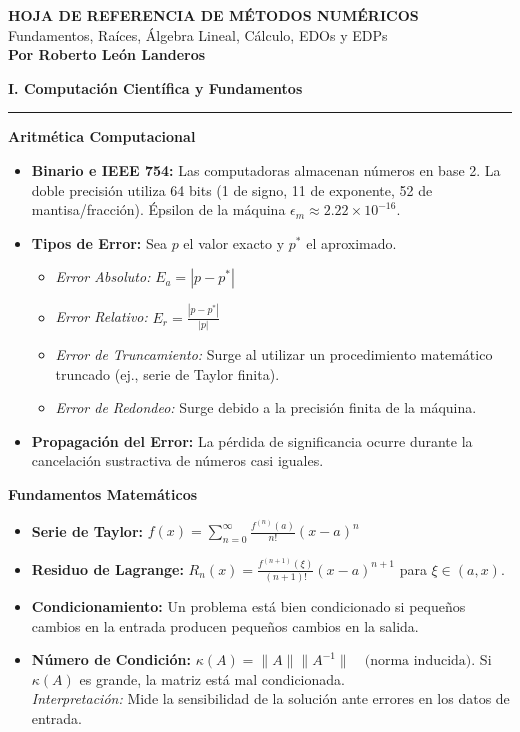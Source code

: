 \documentclass[10pt, landscape, twocolumn]{article}
\newcommand{\cheatsheetsection}[1]{
    \vspace{0.6em}
    {\color{themeblue}\large\bfseries #1} \par
    \vspace{-0.5em}
    {\color{themeblue}\rule{\linewidth}{1pt}} \par
    \vspace{0.2em}
}
\newcommand{\cheatsheetsubsection}[1]{
    \vspace{0.4em}
    {\color{themeblue}\normalsize\bfseries #1} \par
    \vspace{0.1em}
}
\begin{document}
\begin{center}
    \vspace{-1em}
    {\color{themeblue}\huge\bfseries HOJA DE REFERENCIA DE MÉTODOS NUMÉRICOS}\\[0.6em]
    {\color{themegray}\small Fundamentos, Raíces, Álgebra Lineal, Cálculo, EDOs y EDPs}\\[0.4em]
    {\color{themegray}\footnotesize \textbf{Por Roberto León Landeros}}
\end{center}
\vspace{-1em}

\cheatsheetsection{I. Computación Científica y Fundamentos}

\cheatsheetsubsection{Aritmética Computacional}
\begin{itemize}[leftmargin=*, nosep]
    \item \textbf{Binario e IEEE 754:} Las computadoras almacenan números en base 2. La doble precisión utiliza 64 bits (1 de signo, 11 de exponente, 52 de mantisa/fracción). Épsilon de la máquina $\epsilon_m \approx 2.22 \times 10^{-16}$.
    \item \textbf{Tipos de Error:} Sea $p$ el valor exacto y $p^*$ el aproximado.
    \begin{itemize}[leftmargin=*, nosep]
        \item \textit{Error Absoluto:} $E_a = |p - p^*|$
        \item \textit{Error Relativo:} $E_r = \frac{|p - p^*|}{|p|}$
        \item \textit{Error de Truncamiento:} Surge al utilizar un procedimiento matemático truncado (ej., serie de Taylor finita).
        \item \textit{Error de Redondeo:} Surge debido a la precisión finita de la máquina.
    \end{itemize}
    \item \textbf{Propagación del Error:} La pérdida de significancia ocurre durante la cancelación sustractiva de números casi iguales.
\end{itemize}

\cheatsheetsubsection{Fundamentos Matemáticos}
\begin{itemize}[leftmargin=*, nosep]
    \item \textbf{Serie de Taylor:} $f(x) = \sum_{n=0}^{\infty} \frac{f^{(n)}(a)}{n!}(x-a)^n$
    \item \textbf{Residuo de Lagrange:} $R_n(x) = \frac{f^{(n+1)}(\xi)}{(n+1)!}(x-a)^{n+1}$ para $\xi \in (a,x)$. 
    \item \textbf{Condicionamiento:} Un problema está bien condicionado si pequeños cambios en la entrada producen pequeños cambios en la salida.
    \item \textbf{Número de Condición:} $\kappa(A) = \|A\| \|A^{-1}\| \quad \text{(norma inducida)}$. Si $\kappa(A)$ es grande, la matriz está mal condicionada. \\
    \textit{Interpretación:} Mide la sensibilidad de la solución ante errores en los datos de entrada.
\end{itemize}
\end{document}
